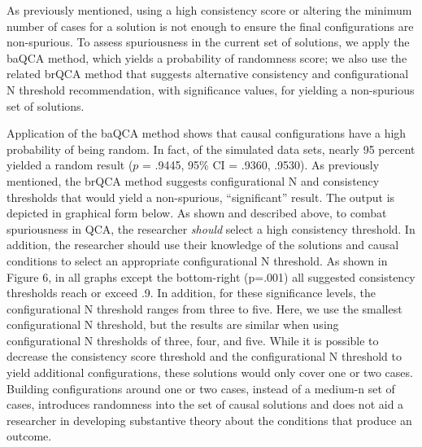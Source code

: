 \documentclass[12pt]{article}
\begin{document}
{As previously mentioned, using a high consistency score or altering the minimum number of cases for a solution is not enough to ensure the final configurations are non-spurious. To assess spuriousness in the current set of solutions, we apply the baQCA method, which yields a probability of randomness score; we also use the related brQCA method that suggests alternative consistency and configurational N threshold recommendation, with significance values, for yielding a non-spurious set of solutions. 

Application of the baQCA method shows that causal configurations have a high probability of being random. In fact, of the simulated data sets, nearly 95 percent yielded a random result ($p$ = .9445, 95\% CI = .9360, .9530). As previously mentioned, the brQCA method suggests configurational N and consistency thresholds that would yield a non-spurious, ``significant'' result. The output is depicted in graphical form below. As shown and described above, to combat spuriousness in QCA, the researcher {\it{should}} select a high consistency threshold. In addition, the researcher should use their knowledge of the solutions and causal conditions to select an appropriate configurational N threshold. As shown in Figure 6, in all graphs except the bottom-right (p=.001) all suggested consistency thresholds reach or exceed .9. In addition, for these significance levels, the configurational N threshold ranges from three to five. Here, we use the smallest configurational N threshold, but the results are similar when using configurational N thresholds of three, four, and five. While it is possible to decrease the consistency score threshold and the configurational N threshold to yield additional configurations, these solutions would only cover one or two cases. Building configurations around one or two cases, instead of a medium-n set of cases, introduces randomness into the set of causal solutions and does not aid a researcher in developing substantive theory about the conditions that produce an outcome.

}
\end{document}
